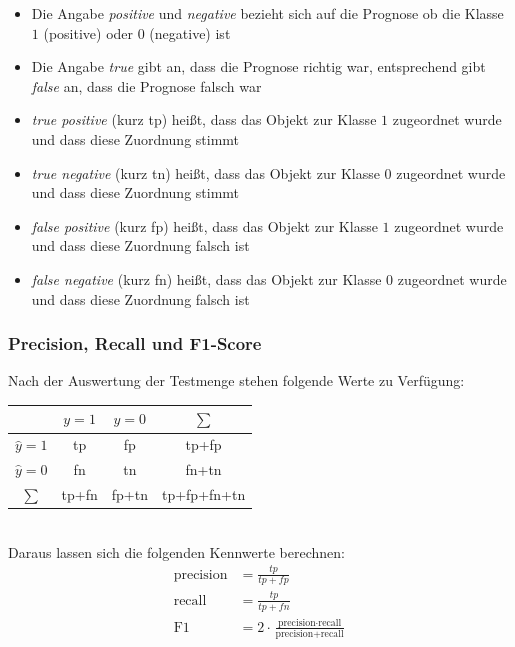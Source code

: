 \begin{frame}
\begin{itemize}[<+->]
\item Die Angabe \textit{positive} und \textit{negative} bezieht sich auf die Prognose ob die Klasse $1$ (positive) oder $0$ (negative) ist
\item Die Angabe \textit{true} gibt an, dass die Prognose richtig war, entsprechend gibt \textit{false} an, dass die Prognose falsch war
\item \textit{true positive} (kurz tp) heißt, dass das Objekt zur Klasse $1$ zugeordnet wurde und dass diese Zuordnung stimmt
\item \textit{true negative} (kurz tn) heißt, dass das Objekt zur Klasse $0$ zugeordnet wurde und dass diese Zuordnung stimmt
\item \textit{false positive} (kurz fp) heißt, dass das Objekt zur Klasse $1$ zugeordnet wurde und dass diese Zuordnung falsch ist
\item \textit{false negative} (kurz fn) heißt, dass das Objekt zur Klasse $0$ zugeordnet wurde und dass diese Zuordnung falsch ist
\end{itemize}
\end{frame}
\begin{frame}
\frametitle{Precision, Recall und F1-Score}
Nach der Auswertung der Testmenge stehen folgende Werte zu Verfügung:
\begin{tabular}{|c|c|c|c|}
\hline 
 & $ y = 1 $ & $y = 0$ & $\sum$ \\ 
\hline 
$\hat{y} = 1 $& tp & fp & tp+fp \\ 
\hline 
$\hat{y} = 0 $ & fn & tn & fn+tn \\ 
\hline 
$\sum$ & tp+fn & fp+tn & tp+fp+fn+tn \\ 
\hline 
\end{tabular}\\
Daraus lassen sich die folgenden Kennwerte berechnen:
\begin{align*}
\text{precision} &= \frac{tp}{tp+fp}\\
\text{recall} &= \frac{tp}{tp+fn}\\
\text{F1} &= 2 \cdot\frac{\text{precision}\cdot\text{recall}}{\text{precision}+\text{recall}}
\end{align*} 
\end{frame}
